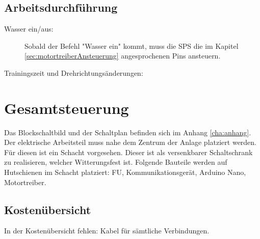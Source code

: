 \subsection{Arbeitsdurchführung}
\label{sec:arbeitsdurchführung}

\begin{description}
\item[Wasser ein/aus:]
Sobald der Befehl "Wasser ein" kommt, muss die SPS die im Kapitel \ref{sec:motortreiberAnsteuerung} angesprochenen Pins ansteuern. 

\item[Trainingszeit und Drehrichtungsänderungen:]


\end{description}

\newpage

\section{Gesamtsteuerung}
\label{sec:gesamtsteuerung}

Das Blockschaltbild und der Schaltplan befinden sich im Anhang \ref{cha:anhang}.
Der elektrische Arbeitsteil muss nahe dem Zentrum der Anlage platziert werden. Für diesen ist ein Schacht vorgesehen. Dieser ist als versenkbarer Schaltschrank zu realisieren, welcher Witterungsfest ist. Folgende Bauteile werden auf Hutschienen im Schacht platziert: \ac{FU}, Kommunikationsgerät, Arduino Nano, Motortreiber.

\subsection{Kostenübersicht}
\label{sec:kostenuebersicht}

In der Kostenübersicht fehlen: Kabel für sämtliche Verbindungen.\\

